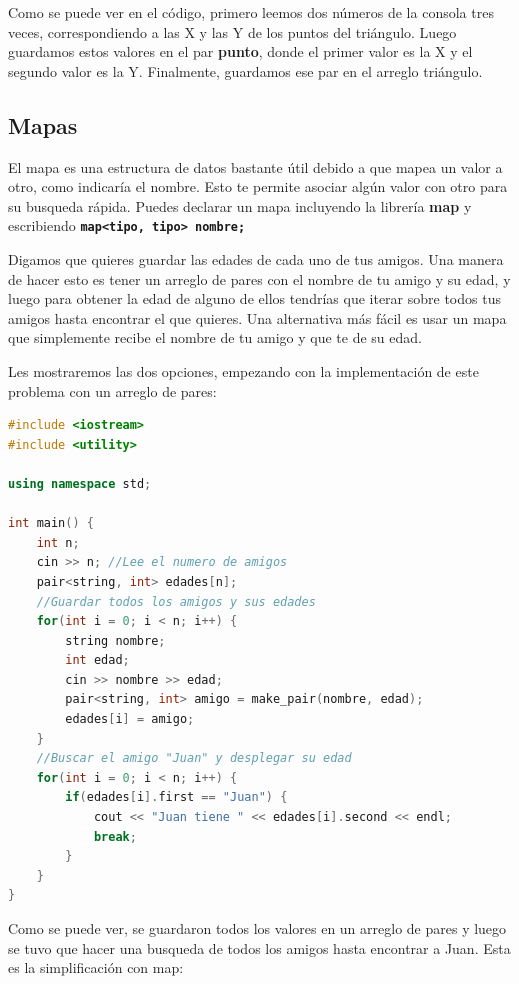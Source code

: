 \documentclass{article}
\begin{document}
Como se puede ver en el código, primero leemos dos números de la consola tres veces, correspondiendo a las X y las Y de los puntos del triángulo. Luego guardamos estos valores en el par \textbf{punto}, donde el primer valor es la X y el segundo valor es la Y. Finalmente, guardamos ese par en el arreglo triángulo.

\subsection{Mapas}

El mapa es una estructura de datos bastante útil debido a que mapea un valor a otro, como indicaría el nombre. Esto te permite asociar algún valor con otro para su busqueda rápida. Puedes declarar un mapa incluyendo la librería \textbf{map} y escribiendo \textbf{\lstinline{map<tipo, tipo> nombre;}}

Digamos que quieres guardar las edades de cada uno de tus amigos. Una manera de hacer esto es tener un arreglo de pares con el nombre de tu amigo y su edad, y luego para obtener la edad de alguno de ellos tendrías que iterar sobre todos tus amigos hasta encontrar el que quieres. Una alternativa más fácil es usar un mapa que simplemente recibe el nombre de tu amigo y que te de su edad.

Les mostraremos las dos opciones, empezando con la implementación de este problema con un arreglo de pares:

\begin{lstlisting}[language=C++, caption=Implementación con pares]
#include <iostream>
#include <utility>

using namespace std;

int main() {
    int n;
    cin >> n; //Lee el numero de amigos
    pair<string, int> edades[n];
    //Guardar todos los amigos y sus edades
    for(int i = 0; i < n; i++) {
        string nombre;
        int edad;
        cin >> nombre >> edad;
        pair<string, int> amigo = make_pair(nombre, edad);
        edades[i] = amigo;
    }
    //Buscar el amigo "Juan" y desplegar su edad
    for(int i = 0; i < n; i++) {
        if(edades[i].first == "Juan") {
            cout << "Juan tiene " << edades[i].second << endl;
            break;
        }
    }
}
\end{lstlisting}

Como se puede ver, se guardaron todos los valores en un arreglo de pares y luego se tuvo que hacer una busqueda de todos los amigos hasta encontrar a Juan. Esta es la simplificación con map:
\end{document}
